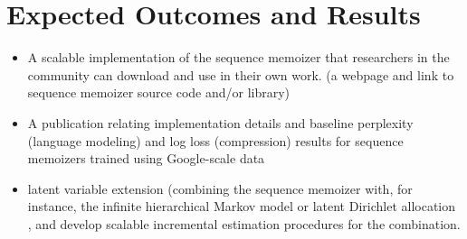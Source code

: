 \documentclass[12pt]{article}
\begin{document}
{{\section{Expected Outcomes and Results}

\begin{itemize}
\item A scalable implementation of the sequence memoizer that researchers in the community can download and use in their own work.  (a webpage and link to sequence memoizer source code and/or library)
\item A publication relating implementation details and baseline perplexity (language modeling) and log loss (compression) results for sequence memoizers trained using Google-scale data 
\item latent variable extension (combining the sequence memoizer with, for instance, the infinite hierarchical Markov model \citep{Heller2009} or latent Dirichlet allocation \citep{Blei2003}, and develop scalable incremental estimation procedures for the combination.
\end{itemize}
}
\vspace{.1cm}
}%
\vspace{.1cm}
\vspace{.1cm}

\newpage
\small


\end{document}
